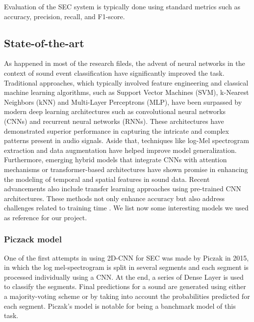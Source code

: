 \documentclass{article}
\begin{document}
\begin{sloppy}
Evaluation of the SEC system is typically done using standard metrics such as accuracy, precision, recall, and F1-score.

\subsection{State-of-the-art}
\label{sec:state_of_the_art}
As happened in most of the research fileds, the advent of neural networks in the context of sound event classification have significantly improved the task.
Traditional approaches, which typically involved feature engineering and classical machine learning algorithms, such as Support Vector Machines (SVM),
k-Nearest Neighbors (kNN) and Multi-Layer Perceptrons (MLP), have been surpassed by
modern deep learning architectures such as convolutional neural networks (CNNs) and recurrent neural networks (RNNs). 
These architectures have demonstrated superior performance in capturing the intricate and complex patterns present in audio signals.
Aside that,  techniques like log-Mel spectrogram extraction and data augmentation have helped improve model
generalization. Furthermore, emerging hybrid
models that integrate CNNs with attention mechanisms or transformer-based architectures have shown promise in enhancing the modeling of temporal
and spatial features in sound data. Recent advancements also include transfer learning approaches using pre-trained
CNN architectures. These methods not only enhance accuracy but also address challenges related to training time \cite{electronics11152279, ReviewSoundEvent2025}.
We list now some interesting models we used as reference for our project.


\subsubsection{Piczack model}
\label{sec:piczack_model}
One of the first attempts in using 2D-CNN for SEC was made by Piczak \cite{Piczak2015environmental} in 2015, in which the log mel-spectrogram is split in several segments
and each segment is processed individually using a CNN. At the end, a series of Dense Layer is used to classify the segments.
Final predictions for a sound are generated using either a majority-voting scheme or by taking into account the
probabilities predicted for each segment. Piczak's model is notable for being a banchmark model of this task.


\end{sloppy}
\end{document}
